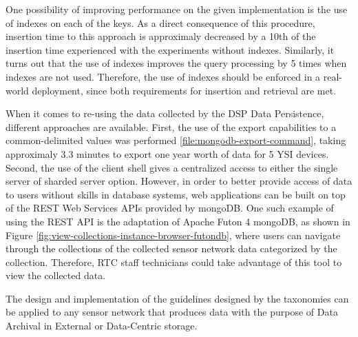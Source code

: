 One possibility of improving performance on the given implementation is the use
of indexes on each of the keys. As a direct consequence of this procedure,
insertion time to this approach is approximaly decreased by a 10th of the
insertion time experienced with the experiments without indexes. Similarly, it
turns out that the use of indexes improves the query processing by 5 times when
indexes are not used. Therefore, the use of indexes should be enforced in a
real-world deployment, since both requirements for insertion and retrieval are
met.

When it comes to re-using the data collected by the DSP Data Persistence,
different approaches are available. First, the use of the export capabilities
to a common-delimited values was performed \ref{file:mongodb-export-command},
taking approximaly 3.3 minutes to export one year worth of data for 5 YSI
devices. Second, the use of the client shell gives a centralized access to
either the single server of sharded server option. However, in order to better
provide access of data to users without skills in database systems, web
applications can be built on top of the REST \cite{http-rest} Web Services APIs
provided by mongoDB. One such example of using the REST API is the adaptation
of Apache Futon 4 mongoDB, as shown in Figure
\ref{fig:view-collections-instance-browser-futondb}, where users can navigate
through the collections of the collected sensor network data categorized by the
collection. Therefore, RTC staff technicians could take advantage of this tool
to view the collected data.

The design and implementation of the guidelines designed by the taxonomies can
be applied to any sensor network that produces data with the purpose of Data
Archival in External or Data-Centric storage. 

